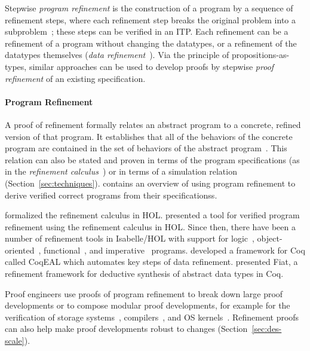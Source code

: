 Stepwise \textit{program refinement} is the construction of a program by a sequence of refinement steps,
where each refinement step breaks the original problem into a subproblem~\citep{Wirth1971};
these steps can be verified in an ITP.
Each refinement can be a refinement of a program without changing the datatypes, or a refinement of
the datatypes themselves (\textit{data refinement}~\citep{de1998data}).
Via the principle of propositions-as-types, similar approaches can be used to develop proofs by stepwise \textit{proof refinement} of an existing
specification.

\paragraph{Program Refinement}
A proof of refinement formally relates an abstract program to a concrete, refined version of that program.
It establishes that all of the behaviors of the concrete program are contained in the set of behaviors of the abstract program~\citep{de1998data}.
This relation can also be stated and proven in terms of the program specifications (as in the \textit{refinement calculus}~\citep{back1988calculus})
or in terms of a simulation relation (Section~\ref{sec:techniques}).
\cite{FRAPBook}	contains an overview of using program refinement to derive verified correct programs from their specificationss.

\cite{back1991} formalized the refinement calculus in HOL.
\cite{vonwright1994} presented a tool for verified program refinement using the refinement calculus in HOL.
Since then, there have been a number of refinement tools in Isabelle/HOL with support for logic~\citep{hemer2001}, object-oriented~\citep{Liu2011},
functional~\citep{lammich2013refinement}, and imperative~\citep{lammich2015refinement} programs.
\cite{Cohen2013} developed a framework for Coq called CoqEAL which automates key steps of data refinement.
\cite{Delaware2015} presented Fiat, a refinement framework for deductive synthesis of abstract data types in Coq.

Proof engineers use proofs of program refinement to break down large proof developments or to compose modular proof developments,
for example for the verification of storage systems~\citep{Chajed2019}, compilers~\citep{Leroy2009, Rizkallah16, Kumar2014}, and
OS kernels~\citep{Klein2014micro, Gu-al:POPL15, Gu-al:OSDI16}.
Refinement proofs can also help make proof developments robust to changes (Section~\ref{sec:des-scale}).

